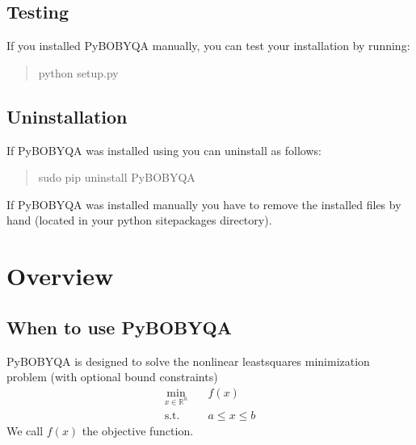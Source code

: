 \documentclass[letterpaper,10pt,english]{sphinxmanual}
\begin{document}
\section{Testing}
\label{\detokenize{install:testing}}
If you installed Py\sphinxhyphen{}BOBYQA manually, you can test your installation by running:
\begin{quote}

\begin{sphinxVerbatim}[commandchars=\\\{\}]
\PYGZdl{} python setup.py 
\end{sphinxVerbatim}
\end{quote}


\section{Uninstallation}
\label{\detokenize{install:uninstallation}}
If Py\sphinxhyphen{}BOBYQA was installed using  you can uninstall as follows:
\begin{quote}

\begin{sphinxVerbatim}[commandchars=\\\{\}]
\PYGZdl{} \PYG{o}{[}sudo\PYG{o}{]} pip uninstall Py\PYGZhy{}BOBYQA
\end{sphinxVerbatim}
\end{quote}

If Py\sphinxhyphen{}BOBYQA was installed manually you have to remove the installed files by hand (located in your python site\sphinxhyphen{}packages directory).


\chapter{Overview}
\label{\detokenize{info:overview}}\label{\detokenize{info::doc}}

\section{When to use Py\sphinxhyphen{}BOBYQA}
\label{\detokenize{info:when-to-use-py-bobyqa}}
Py\sphinxhyphen{}BOBYQA is designed to solve the nonlinear least\sphinxhyphen{}squares minimization problem (with optional bound constraints)
\begin{equation*}
\begin{split}\min_{x\in\mathbb{R}^n}  &\quad  f(x)\\
\text{s.t.} &\quad  a \leq x \leq b\end{split}
\end{equation*}
We call \(f(x)\) the objective function.
\end{document}
